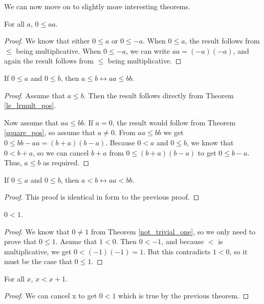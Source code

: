 \documentclass[../math.tex]{subfiles}
\begin{document}
We can now move on to slightly more interesting theorems.

\begin{theorem} \label{square_pos}
    For all $a$, $0 \leq aa$.
\end{theorem}
\begin{proof}
    We know that either $0 \leq a$ or $0 \leq -a$.  When $0 \leq a$, the result
    follows from $\leq$ being multiplicative.  When $0 \leq -a$, we can write
    $aa = (-a)(-a)$, and again the result follows from $\leq$ being
    multiplicative.
\end{proof}

\begin{theorem}
    If $0 \leq a$ and $0 \leq b$, then $a \leq b \leftrightarrow aa \leq bb$.
\end{theorem}
\begin{proof}
    Assume that $a \leq b$.  Then the result follows directly from Theorem
    \ref{le_lrmult_pos}.

    Now assume that $aa \leq bb$.  If $a = 0$, the result would follow from
    Theorem \ref{square_pos}, so assume that $a \neq 0$.  From $aa \leq bb$ we
    get $0 \leq bb - aa = (b + a)(b - a)$.  Because $0 < a$ and $0 \leq b$, we
    know that $0 < b + a$, so we can cancel $b + a$ from $0 \leq (b + a)(b - a)$
    to get $0 \leq b - a$.  Thus, $a \leq b$ as required.
\end{proof}

\begin{theorem}
    If $0 \leq a$ and $0 \leq b$, then $a < b \leftrightarrow aa < bb$.
\end{theorem}
\begin{proof}
    This proof is identical in form to the previous proof.
\end{proof}

\begin{theorem} \label{one_pos}
    $0 < 1$.
\end{theorem}
\begin{proof}
    We know that $0 \neq 1$ from Theorem \ref{not_trivial_one}, so we only need
    to prove that $0 \leq 1$.  Asume that $1 < 0$.  Then $0 < -1$, and because
    $<$ is multiplicative, we get $0 < (-1)(-1) = 1$.  But this contradicts $1 <
    0$, so it must be the case that $0 \leq 1$.
\end{proof}

\begin{theorem}
    For all $x$, $x < x + 1$.
\end{theorem}
\begin{proof}
    We can cancel x to get $0 < 1$ which is true by the previous theorem.
\end{proof}
\end{document}
